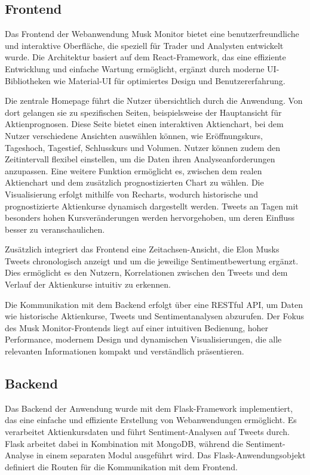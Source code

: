 \documentclass[conference,a4paper,flushend]{cs-techrep}
\begin{document}
\subsection{Frontend}
Das Frontend der Webanwendung Musk Monitor bietet eine benutzerfreundliche und interaktive Oberfläche, die speziell für Trader und Analysten entwickelt wurde. Die Architektur basiert auf dem React-Framework, das eine effiziente Entwicklung und einfache Wartung ermöglicht, ergänzt durch moderne UI-Bibliotheken wie Material-UI für optimiertes Design und Benutzererfahrung.

Die zentrale Homepage führt die Nutzer übersichtlich durch die Anwendung. Von dort gelangen sie zu spezifischen Seiten, beispielsweise der Hauptansicht für Aktienprognosen. Diese Seite bietet einen interaktiven Aktienchart, bei dem Nutzer verschiedene Ansichten auswählen können, wie Eröffnungskurs, Tageshoch, Tagestief, Schlusskurs und Volumen. Nutzer können zudem den Zeitintervall flexibel einstellen, um die Daten ihren Analyseanforderungen anzupassen. Eine weitere Funktion ermöglicht es, zwischen dem realen Aktienchart und dem zusätzlich prognostizierten Chart zu wählen. Die Visualisierung erfolgt mithilfe von Recharts, wodurch historische und prognostizierte Aktienkurse dynamisch dargestellt werden. Tweets an Tagen mit besonders hohen Kursveränderungen werden hervorgehoben, um deren Einfluss besser zu veranschaulichen.

Zusätzlich integriert das Frontend eine Zeitachsen-Ansicht, die Elon Musks Tweets chronologisch anzeigt und um die jeweilige Sentimentbewertung ergänzt. Dies ermöglicht es den Nutzern, Korrelationen zwischen den Tweets und dem Verlauf der Aktienkurse intuitiv zu erkennen.

Die Kommunikation mit dem Backend erfolgt über eine RESTful API, um Daten wie historische Aktienkurse, Tweets und Sentimentanalysen abzurufen. Der Fokus des Musk Monitor-Frontends liegt auf einer intuitiven Bedienung, hoher Performance, modernem Design und dynamischen Visualisierungen, die alle relevanten Informationen kompakt und verständlich präsentieren.

\subsection{Backend} 
Das Backend der Anwendung wurde mit dem Flask-Framework implementiert, das eine einfache und effiziente Erstellung von Webanwendungen ermöglicht. Es verarbeitet Aktienkursdaten und führt Sentiment-Analysen auf Tweets durch. Flask arbeitet dabei in Kombination mit MongoDB, während die Sentiment-Analyse in einem separaten Modul ausgeführt wird. Das Flask-Anwendungsobjekt definiert die Routen für die Kommunikation mit dem Frontend.
\end{document}
